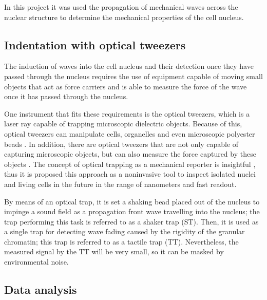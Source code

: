 \documentclass[12pt, a4paper]{article} %
\begin{document}
In this project it was used the propagation of mechanical waves across the nuclear structure to determine the mechanical properties of the cell nucleus.

\setlength{\parskip}{0mm}

\subsection{Indentation with optical tweezers}

The induction of waves into the cell nucleus and their detection once they have passed through the nucleus requires the use of equipment capable of moving small objects that act as force carriers and is able to measure the force of the wave once it has passed through the nucleus. 

\setlength{\parskip}{4mm}

One instrument that fits these requirements is the optical tweezers, which is a laser ray capable of trapping microscopic dielectric objects. Because of this, optical tweezers can manipulate cells, organelles and even microscopic polyester beads \cite{novotny1997theory, ombid2020vitro, ashkin1992forces}. In addition, there are optical tweezers that are not only capable of capturing microscopic objects, but can also measure the force captured by these objects \cite{farre2014force}. The concept of optical trapping as a mechanical reporter is insightful \cite{ashkin20182018}, thus it is proposed this approach as a noninvasive tool to inspect isolated nuclei and living cells in the future in the range of nanometers and fast readout.

By means of an optical trap, it is set a shaking bead placed out of the nucleus to impinge a sound field as a propagation front wave travelling into the nucleus; the trap performing this task is referred to as a shaker trap (ST). Then, it is used as a single trap for detecting wave fading caused by the rigidity of the granular chromatin; this trap is referred to as a tactile trap (TT). Nevertheless, the measured signal by the TT will be very small, so it can be masked by environmental noise. 

\setlength{\parskip}{0mm}

\subsection{Data analysis}
\end{document}
